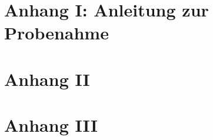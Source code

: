 \section{Anhang I: Anleitung zur Probenahme}
\blindtext

\section{Anhang II}
\blindtext

\section{Anhang III}
\blindtext

